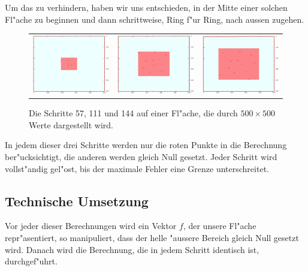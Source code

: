 \begin{refsection}
Um das zu verhindern, haben wir uns entschieden, in der Mitte einer
solchen Fl"ache zu beginnen und dann schrittweise, Ring f"ur Ring,
nach aussen zugehen.

\begin{figure}
\centering
\begin{tabular}{ccc}
\includegraphics[width=0.3\hsize]{green/images/resultate/grfl/step0057.png}
& \includegraphics[width=0.3\hsize]{green/images/resultate/grfl/step0111.png}
& \includegraphics[width=0.3\hsize]{green/images/resultate/grfl/step0144.png}
\end{tabular}		
\caption{Die Schritte 57, 111 und 144 auf einer Fl"ache, die durch
$500 \times 500$ Werte dargestellt wird.}
\label{fig:dreiSchritte}
\end{figure}
	
In jedem dieser drei Schritte werden nur die roten Punkte in die
Berechnung ber"ucksichtigt, die anderen werden gleich Null gesetzt.
Jeder Schritt wird vollst"andig gel"ost, bis der maximale Fehler
eine Grenze unterschreitet.
	
\subsection{Technische Umsetzung}
	
Vor jeder dieser Berechnungen wird ein Vektor $f$, der unsere Fl"ache
repr"asentiert, so manipuliert, dass der helle "aussere Bereich
gleich Null gesetzt wird. Danach wird die Berechnung, die in jedem
Schritt identisch ist, durchgef"uhrt.
		

\end{refsection}
